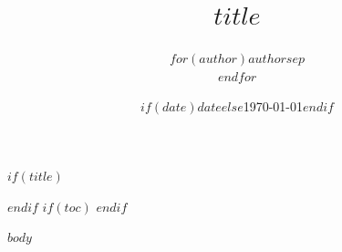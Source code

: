\documentclass[12pt,a4paper]{article}
\title{$title$}
\author{$for(author)$$author$$sep$ \\ $endfor$}
\date{$if(date)$$date$$else$\today$endif$}
\begin{document}
$if(title)$
\maketitle
$endif$
$if(toc)$
\renewcommand{\contentsname}{$toc-title$}
\tableofcontents
\newpage
$endif$

$body$
\end{document}
